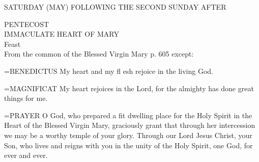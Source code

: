 \begin{center}
\normalsize \begin{center}\normalsize SATURDAY (MAY) FOLLOWING THE SECOND SUNDAY AFTER\\
\end{center}
\footnotesize PENTECOST\\
\footnotesize IMMACULATE HEART OF MARY\\
\footnotesize Feast\\
\footnotesize From the common of the Blessed Virgin Mary p. 605 except:\\
\end{center}

\hangindent=\parindent \small{BENEDICTUS  My heart and my fl esh rejoice in the living God.\\}
 
\hangindent=\parindent \small{MAGNIFICAT  My heart rejoices in the Lord, for the almighty has done
great things for me.\\}
 
\hangindent=\parindent \small{PRAYER 
O God, who prepared a fit dwelling place for the Holy Spirit
in the Heart of the Blessed Virgin Mary,
graciously grant that through her intercession
we may be a worthy temple of your glory.
Through our Lord Jesus Christ, your Son,
who lives and reigns with you in the unity of the Holy Spirit,
one God, for ever and ever.\\}
 
